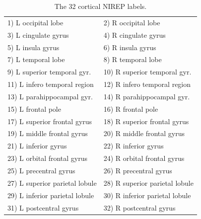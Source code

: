 
\begin{table}
\centering
\begin{tabular*}{0.9\textwidth}{@{\extracolsep{\fill}} l l}
\toprule
  1) L occipital lobe & 2) R occipital lobe \\
  3) L cingulate gyrus & 4) R cingulate gyrus \\
  5) L insula gyrus & 6) R insula gyrus \\
  7) L temporal lobe & 8) R temporal lobe \\
  9) L superior temporal gyr. & 10) R superior temporal gyr. \\
  11) L infero temporal region & 12) R infero temporal region \\
  13) L parahippocampal gyr. & 14) R parahippocampal gyr. \\
  15) L frontal pole & 16) R frontal pole \\
  17) L superior frontal gyrus & 18) R superior frontal gyrus \\
  19) L middle frontal gyrus & 20) R middle frontal gyrus \\
  21) L inferior gyrus & 22) R inferior gyrus \\
  23) L orbital frontal gyrus & 24) R orbital frontal gyrus \\
  25) L precentral gyrus & 26) R precentral gyrus \\
  27) L superior parietal lobule & 28) R superior parietal lobule \\
  29) L inferior parietal lobule & 30) R inferior parietal lobule \\
  31) L postcentral gyrus & 32)   R postcentral gyrus \\  
\bottomrule
\end{tabular*}
\caption{The 32 cortical NIREP labels.}
\label{table:nirep_labels}
\end{table}


